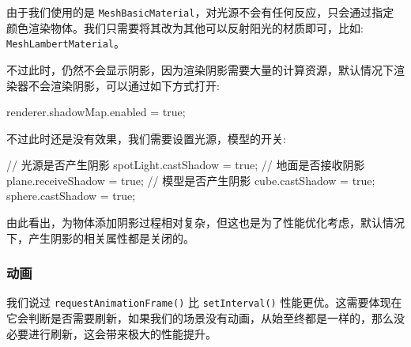 由于我们使用的是 \texttt{MeshBasicMaterial}，对光源不会有任何反应，只会通过指定颜色渲染物体。我们只需要将其改为其他可以反射阳光的材质即可，比如: \texttt{MeshLambertMaterial}。

不过此时，仍然不会显示阴影，因为渲染阴影需要大量的计算资源，默认情况下渲染器不会渲染阴影，可以通过如下方式打开:

\begin{JavaScript}
renderer.shadowMap.enabled = true;
\end{JavaScript}

不过此时还是没有效果，我们需要设置光源，模型的开关:
\begin{JavaScript}
// 光源是否产生阴影
spotLight.castShadow = true;
// 地面是否接收阴影
plane.receiveShadow = true;
// 模型是否产生阴影
cube.castShadow = true;
sphere.castShadow = true;
\end{JavaScript}

由此看出，为物体添加阴影过程相对复杂，但这也是为了性能优化考虑，默认情况下，产生阴影的相关属性都是关闭的。

\subsubsection{动画}

我们说过 \texttt{requestAnimationFrame()} 比 \texttt{setInterval()} 性能更优。这需要体现在它会判断是否需要刷新，如果我们的场景没有动画，从始至终都是一样的，那么没必要进行刷新，这会带来极大的性能提升。


\newpage